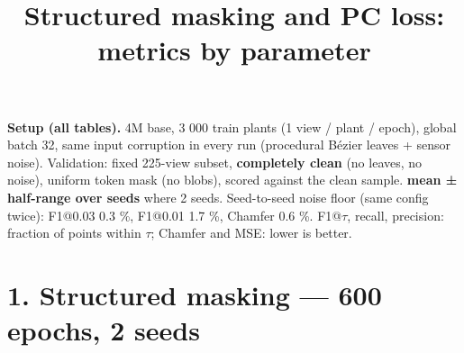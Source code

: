 \documentclass[
  10pt,
]{article}
\title{Structured masking and PC loss: metrics by parameter}
\author{}
\date{}
\begin{document}
\maketitle

\textbf{Setup (all tables).} 4M base, 3 000 train plants (1 view / plant
/ epoch), global batch 32, same input corruption in every run
(procedural Bézier leaves + sensor noise). Validation: fixed 225-view
subset, \textbf{completely clean} (no leaves, no noise), uniform token
mask (no blobs), scored against the clean sample. \textbf{mean ±
half-range over seeds} where 2 seeds. Seed-to-seed noise floor (same
config twice): F1@0.03 0.3 \%, F1@0.01 1.7 \%, Chamfer 0.6 \%.
F1@\(\tau\), recall, precision: fraction of points within \(\tau\);
Chamfer and MSE: lower is better.

\section{1. Structured masking --- 600 epochs, 2
seeds}\label{structured-masking-600-epochs-2-seeds}
\end{document}
